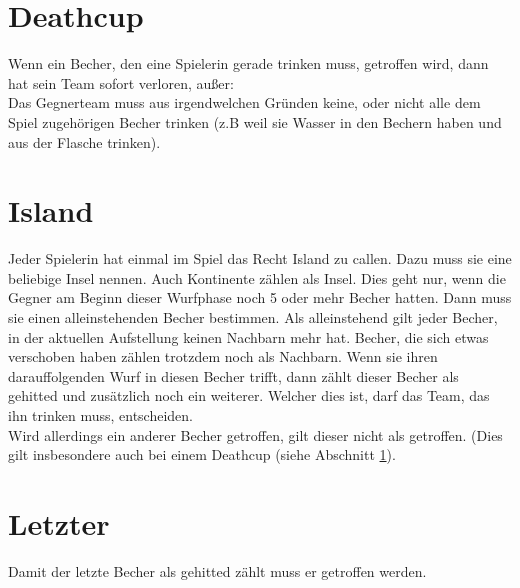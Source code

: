 \documentclass[a5paper, 12pt]{book}
\begin{document}
\section{Deathcup}\label{deathcup}
Wenn ein Becher, den eine Spielerin gerade trinken muss, getroffen wird, dann hat sein Team sofort verloren, außer:\\
Das Gegnerteam muss aus irgendwelchen Gründen keine, oder nicht alle dem Spiel zugehörigen Becher trinken (z.B weil sie Wasser in den Bechern haben und aus der Flasche trinken).
\section{Island}\label{island}
Jeder Spielerin hat einmal im Spiel das Recht Island zu callen. Dazu muss sie eine beliebige Insel nennen. Auch Kontinente zählen als Insel. Dies geht nur, wenn die Gegner am Beginn dieser Wurfphase noch 5 oder mehr Becher hatten. Dann muss sie einen alleinstehenden Becher bestimmen. Als alleinstehend gilt jeder Becher, in der aktuellen Aufstellung keinen Nachbarn mehr hat. Becher, die sich etwas verschoben haben zählen trotzdem noch als Nachbarn. Wenn sie ihren darauffolgenden Wurf in diesen Becher trifft, dann zählt dieser Becher als gehitted und zusätzlich noch ein weiterer. Welcher dies ist, darf das Team, das ihn trinken muss, entscheiden.\\
Wird allerdings ein anderer Becher getroffen, gilt dieser nicht als getroffen. (Dies gilt insbesondere auch bei einem Deathcup (siehe Abschnitt \ref{deathcup}).
\section{Letzter}\label{letzter}
Damit der letzte Becher als gehitted zählt muss er getroffen werden. 
\end{document}
